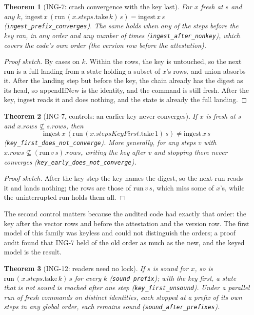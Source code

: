 \documentclass[11pt]{article}
\theoremstyle{plain}
\newtheorem{theorem}{Theorem}[section]
\theoremstyle{definition}
\theoremstyle{remark}
\newcommand{\lean}[1]{\texttt{#1}}
\newcommand{\ing}[1]{ING-#1}
\begin{document}
\begin{theorem}[\ing{7}: crash convergence with the key last]
\label{thm:ing7}
For $x$ fresh at $s$ and any $k$,
$\mathrm{ingest}\,x\,(\mathrm{run}\,(x.\mathit{steps}.\mathrm{take}\,k)\,s) = \mathrm{ingest}\,x\,s$
(\lean{ingest\_prefix\_converges}). The same holds when any of the steps before the key ran, in
any order and any number of times (\lean{ingest\_after\_nonkey}), which covers the code's own
order (the version row before the attestation).
\end{theorem}

\begin{proof}[Proof sketch]
By cases on $k$. Within the rows, the key is untouched, so the next run is a full landing from a
state holding a subset of $x$'s rows, and union absorbs it. After the landing step but before
the key, the chain already has the digest as its head, so $\mathrm{appendIfNew}$ is the
identity, and the command is still fresh. After the key, $\mathrm{ingest}$ reads it and does
nothing, and the state is already the full landing.
\end{proof}

\begin{theorem}[\ing{7}, controls: an earlier key never converges]
\label{thm:keyfirst}
If $x$ is fresh at $s$ and $x.\mathit{rows} \not\subseteq s.\mathit{rows}$, then
\[
\mathrm{ingest}\,x\,(\mathrm{run}\,(x.\mathit{stepsKeyFirst}.\mathrm{take}\,1)\,s) \ne
\mathrm{ingest}\,x\,s
\]
(\lean{key\_first\_does\_not\_converge}). More generally, for any
steps $v$ with $x.\mathit{rows} \not\subseteq (\mathrm{run}\,v\,s).\mathit{rows}$, writing the
key after $v$ and stopping there never converges (\lean{key\_early\_does\_not\_converge}).
\end{theorem}

\begin{proof}[Proof sketch]
After the key step the key names the digest, so the next run reads it and lands nothing; the
rows are those of $\mathrm{run}\,v\,s$, which miss some of $x$'s, while the uninterrupted run
holds them all.
\end{proof}

The second control matters because the audited code had exactly that order: the key after the
vector rows and before the attestation and the version row. The first model of this family was
keyless and could not distinguish the orders; a proof audit found that \ing{7} held of the old
order as much as the new, and the keyed model is the result.

\begin{theorem}[\ing{12}: readers need no lock]
If $s$ is sound for $x$, so is $\mathrm{run}\,(x.\mathit{steps}.\mathrm{take}\,k)\,s$ for every
$k$ (\lean{sound\_prefix}); with the key first, a state that is not sound is reached after one
step (\lean{key\_first\_unsound}). Under a parallel run of fresh commands on distinct
identities, each stopped at a prefix of its own steps in any global order, each remains sound
(\lean{sound\_after\_prefixes}).
\end{theorem}
\end{document}
